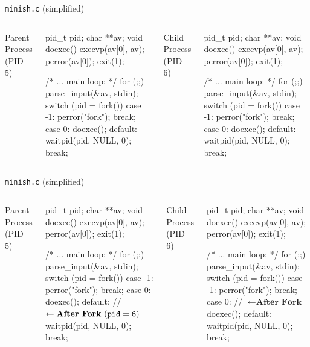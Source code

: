 \documentclass[11pt,aspectratio=169]{beamer}
\begin{document}
\begin{slide}{\texttt{minish.c} (simplified)}
\begin{columns}
Parent Process (PID 5)
\begin{smallccode}[numbers=left]
pid_t pid; char **av;
void doexec() {
  execvp(av[0], av);
  perror(av[0]);
  exit(1);
}    

    /* ... main loop: */
    for (;;) {
      parse_input(&av, stdin);
      switch (pid = fork()) {
      case -1:
	perror("fork"); break;
      case 0:
	doexec();
      default:
	waitpid(pid, NULL, 0); break;
      }
    }
\end{smallccode}
\pause
Child Process (PID 6)
\begin{smallccode}
pid_t pid; char **av;
void doexec() {
  execvp(av[0], av);
  perror(av[0]);
  exit(1);
}    

    /* ... main loop: */
    for (;;) {
      parse_input(&av, stdin);
      switch (pid = fork()) {
      case -1:
	perror("fork"); break;
      case 0:
	doexec();
      default:
	waitpid(pid, NULL, 0); break;
      }
    }
\end{smallccode}
\end{columns}
\end{slide}

\begin{slide}{\texttt{minish.c} (simplified)}
\begin{columns}
Parent Process (PID 5)
\begin{smallccode}[mathescape=true,numbers=left]
pid_t pid; char **av;
void doexec() {
  execvp(av[0], av);
  perror(av[0]);
  exit(1);
}    

    /* ... main loop: */
    for (;;) {
      parse_input(&av, stdin);
      switch (pid = fork()) {
      case -1:
	perror("fork"); break;
      case 0:
	doexec();
      default: // $\leftarrow \textbf{After Fork}~({\tt pid = 6})$
	waitpid(pid, NULL, 0); break;
      }
    }
\end{smallccode}
Child Process (PID 6)
    \begin{smallccode}[mathescape=true,]
pid_t pid; char **av;
void doexec() {
  execvp(av[0], av);
  perror(av[0]);
  exit(1);
}    

    /* ... main loop: */
    for (;;) {
      parse_input(&av, stdin);
      switch (pid = fork()) {
      case -1:
	perror("fork"); break;
      case 0: // $\leftarrow \textbf{After Fork}$
	doexec();
      default:
	waitpid(pid, NULL, 0); break;
      }
    }
\end{smallccode}
\end{columns}
\end{slide}
\end{document}
